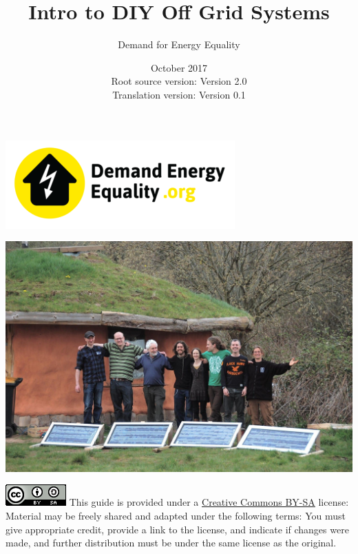 \documentclass{article}
\title{Intro to DIY Off Grid Systems}
\author{Demand for Energy Equality}
\date{October 2017 \\ Root source version: Version 2.0 \\ Translation version: Version 0.1}
\theoremstyle{definition}
\theoremstyle{definition}
\theoremstyle{remark}
\begin{document}
 
\maketitle{}

\begin{center}
  \includegraphics[width=0.25\paperwidth]{../Images/image_0_0_(demand_energy_equality).png}
\end{center}

\begin{center}
  \includegraphics[width=0.65\paperwidth]{../Images/image_0_1_(off_grid).png}
\end{center}

\vfill
  
\includegraphics[]{../Images/image_0_2_(license).png} \newline
This guide is provided under a \href{https://creativecommons.org/licenses/by-sa/4.0/legalcode}{\underline{Creative Commons BY-SA}} license: \newline
Material may be freely shared and adapted under the following terms: You must give appropriate credit, provide a link to the license, and indicate if changes were made, and further distribution must be under the same license as the original.
\end{document}
